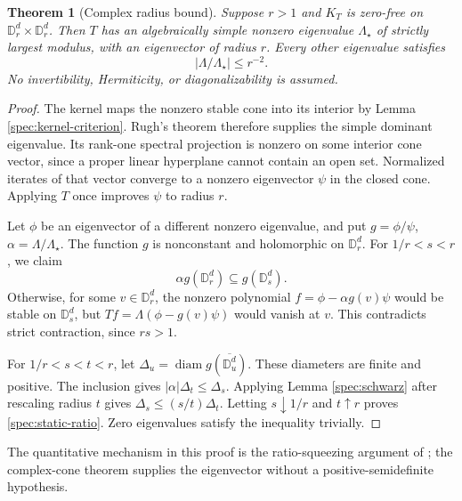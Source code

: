 \documentclass[reqno]{amsart}
\newtheorem{theorem}{Theorem}[section]
\theoremstyle{definition}
\theoremstyle{remark}
\newcommand{\D}{\mathbb D}
\begin{document}
\begin{theorem}[Complex radius bound]\label{spec:radius-gap}
Suppose \(r>1\) and \(K_T\) is zero-free on
\(\D_r^d\times\D_r^d\).  Then \(T\) has an algebraically simple
nonzero eigenvalue \(\Lambda_\star\) of strictly largest modulus,
with an eigenvector of radius \(r\).  Every other eigenvalue satisfies
\begin{equation}\label{spec:static-ratio}
 |\Lambda/\Lambda_\star|\le r^{-2}.
\end{equation}
No invertibility, Hermiticity, or diagonalizability is assumed.
\end{theorem}
\begin{proof}
The kernel maps the nonzero stable cone into its interior by Lemma
\ref{spec:kernel-criterion}.  Rugh's theorem therefore supplies the
simple dominant eigenvalue.  Its rank-one spectral projection is
nonzero on some interior cone vector, since a proper linear hyperplane
cannot contain an open set.  Normalized iterates of that vector converge
to a nonzero eigenvector \(\psi\) in the closed cone.  Applying \(T\)
once improves \(\psi\) to radius \(r\).

Let \(\phi\) be an eigenvector of a different nonzero eigenvalue,
and put \(g=\phi/\psi\), \(\alpha=\Lambda/\Lambda_\star\).
The function \(g\) is nonconstant and holomorphic on \(\D_r^d\).
For \(1/r<s<r\), we claim
\[
 \alpha g(\D_r^d)\subseteq g(\D_s^d).
\]
Otherwise, for some \(v\in\D_r^d\), the nonzero polynomial
\(f=\phi-\alpha g(v)\psi\) would be stable on \(\D_s^d\), but
\(Tf=\Lambda(\phi-g(v)\psi)\) would vanish at \(v\).
This contradicts strict contraction, since \(rs>1\).

For \(1/r<s<t<r\), let
\(\Delta_u=\operatorname{diam}g(\overline{\D_u^d})\).
These diameters are finite and positive.  The inclusion gives
\(|\alpha|\Delta_t\le\Delta_s\).  Applying Lemma
\ref{spec:schwarz} after rescaling radius \(t\) gives
\(\Delta_s\le(s/t)\Delta_t\).  Letting \(s\downarrow1/r\)
and \(t\uparrow r\) proves \eqref{spec:static-ratio}.  Zero
eigenvalues satisfy the inequality trivially.
\end{proof}

The quantitative mechanism in this proof is the ratio-squeezing argument
of \cite{BGLW26}; the complex-cone theorem supplies the eigenvector
without a positive-semidefinite hypothesis.
\end{document}
